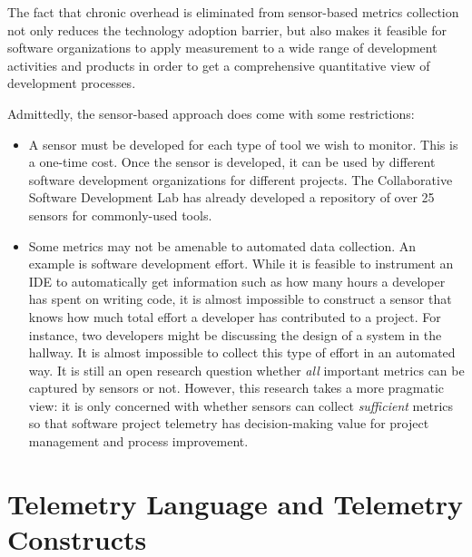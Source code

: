 The fact that chronic overhead is eliminated from sensor-based metrics collection not only reduces the technology adoption barrier, but also makes it feasible for software organizations to apply measurement to a wide range of development activities and products in order to get a comprehensive quantitative view of development processes.


Admittedly, the sensor-based approach does come with some restrictions:

\begin{itemize}
	
	\item A sensor must be developed for each type of tool we wish to monitor. This is a one-time cost. Once the sensor is developed, it can be used by different software development organizations for different projects. The Collaborative Software Development Lab has already developed a repository of over 25 sensors for commonly-used tools.

  \item Some metrics may not be amenable to automated data collection. An example is software development effort. While it is feasible to instrument an IDE to automatically get information such as how many hours a developer has spent on writing code, it is almost impossible to construct a sensor that knows how much total effort a developer has contributed to a project. For instance, two developers might be discussing the design of a system in the hallway. It is almost impossible to collect this type of effort in an automated way. It is still an open research question whether \textit{all} important metrics can be captured by sensors or not. However, this research takes a more pragmatic view: it is only concerned with whether sensors can collect \textit{sufficient} metrics so that software project telemetry has decision-making value for project management and process improvement. 
 
\end{itemize}







\section{Telemetry Language and Telemetry Constructs} 
\label{Telemetry:Component}

